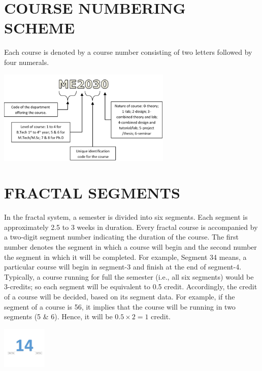 \section{COURSE NUMBERING SCHEME}
Each course is denoted by a course number consisting of two letters followed by four numerals.
\begin{center}
\includegraphics[height=4.5cm]{./parts/course-code}
\end{center}


\section{FRACTAL SEGMENTS}
In the fractal system, a semester is divided into six segments. Each segment is approximately 2.5 to 3 weeks in duration. Every fractal course is accompanied by a two-digit segment number indicating the duration of the course. The first number denotes the segment in which a course will begin and the second number the segment in which it will be completed. For example, Segment 34 means, a particular course will begin in segment-3 and finish at the end of segment-4. Typically, a course running for full the semester (i.e., all six segments) would be 3-credits; so each segment will be equivalent to 0.5 credit. Accordingly, the credit of a course will be decided, based on its segment data. For example, if the segment of a course is 56, it implies that the course will be running in two segments (5 \& 6). Hence, it will be $0.5 \times 2 = 1$ credit. 

\begin{center}
\includegraphics[height=2cm]{./parts/course-segment}
\end{center}

